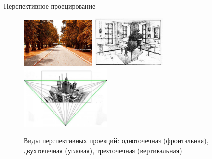 \documentclass{beamer}
\begin{document}
	\begin{frame}{Перспективное проецирование}

		\begin{figure} 
			\includegraphics[width=0.33\textwidth]{images/1-point.jpeg}
			\includegraphics[width=0.33\textwidth]{images/2-point.png}
			\includegraphics[width=0.4\textwidth]{images/3-point.jpg}
			\caption{Виды перспективных проекций: одноточечная (фронтальная), двухточечная (угловая), трехточечная (вертикальная)}
		\end{figure}

	\end{frame}
\end{document}
